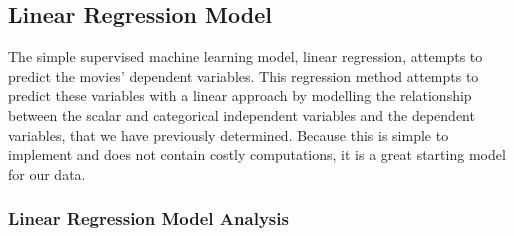 \documentclass[11pt]{article}
\begin{document}
\hypertarget{linear-regression-model}{%
	\subsection{Linear Regression Model}\label{linear-regression-model}}

The simple supervised machine learning model, linear regression, attempts to predict the movies' dependent variables. This regression method attempts to predict these variables with a linear approach by modelling the relationship between the scalar and categorical independent variables and the dependent variables, that we have previously determined. Because this is simple to implement and does not contain costly computations, it is a great starting model for our data.


%
%
%


%

\hypertarget{linear-regression-model-analysis}{%
	\subsubsection{Linear Regression Model
		Analysis}\label{linear-regression-model-analysis}}
\end{document}
